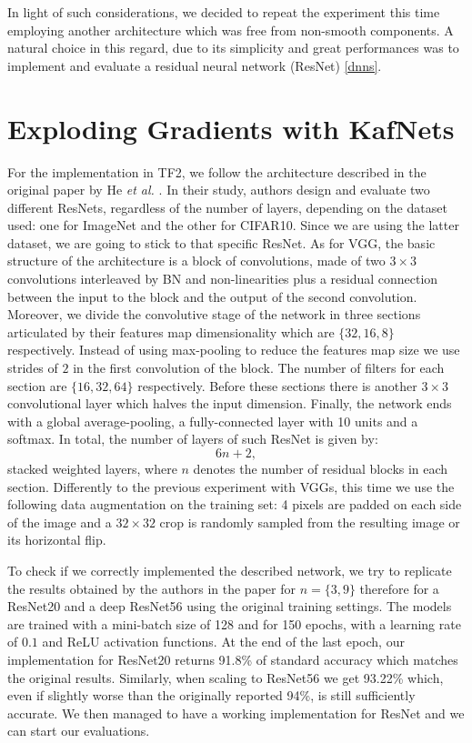 \documentclass[LaM,binding=0.6cm]{./packages/sapthesis/sapthesis}
\begin{document}
        In light of such considerations, we decided to repeat the experiment this time employing another 
        architecture which was free from non-smooth components. A natural choice in this regard, 
        due to its simplicity and great performances was to implement and evaluate a residual neural 
        network (ResNet) \ref{dnns}.  


    \section{Exploding Gradients with KafNets}

        For the implementation in TF2, we follow the architecture described in the original paper by He \textit{et al.} \cite{resnet}.
        In their study, authors design and evaluate two different ResNets, regardless of the number of layers, depending on the dataset used: 
        one for ImageNet and the other for CIFAR10. Since we are using the latter dataset, we are going to stick to that specific ResNet.
        As for VGG, the basic structure of the architecture is a block of convolutions, made of two $3\times3$ convolutions interleaved by BN and non-linearities 
        plus a residual connection between the input to the block and the output of the second convolution. Moreover, we divide the convolutive stage 
        of the network in three sections articulated by their features map dimensionality which are $\{32, 16, 8\}$ respectively. Instead of using 
        max-pooling to reduce the features map size we use strides of $2$ in the first convolution of the block. The number of filters for 
        each section are $\{16, 32, 64\}$ respectively. Before these sections there is another $3\times3$ convolutional layer which halves the input dimension.
        Finally, the network ends with a global average-pooling, a fully-connected layer with 10 units and a softmax.
        In total, the number of layers of such ResNet is given by:
        \begin{equation}
            6n+2,
        \end{equation}
        stacked weighted layers, where $n$ denotes the number of residual blocks in each section.
        Differently to the previous experiment with VGGs, this time we use the following data augmentation on the training set:
        4 pixels are padded on each side of the image and a $32\times32$ crop is randomly sampled from the resulting image or its horizontal flip.

        To check if we correctly implemented the described network, we try to replicate the results obtained by the authors in the paper for $n=\{3, 9\}$ therefore 
        for a ResNet20 and a deep ResNet56 using the original training settings. The models are trained with a mini-batch size of 128 and for 150 epochs, with a learning rate of $0.1$ and ReLU
        activation functions. At the end of the last epoch, our implementation for ResNet20 returns 91.8\% of standard accuracy which matches the original results. Similarly, when scaling to ResNet56 we get 93.22\% which, even if slightly
        worse than the originally reported 94\%, is still sufficiently accurate. We then managed to have a working implementation for ResNet and we can start our evaluations.  
        
\end{document}
